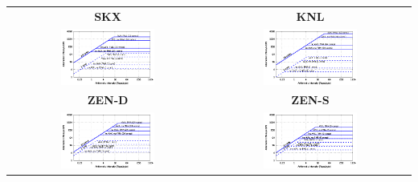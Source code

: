 \begin{tabular}{cc}
\multicolumn{1}{c}{\tiny \bfseries SKX} &
\multicolumn{1}{c}{\tiny \bfseries KNL} \\
  \includegraphics[width=0.49\textwidth,clip=true]{images/roofline/roofline_SKX.pdf}%
  & 
  \includegraphics[width=0.49\textwidth,clip=true]{images/roofline/roofline_KNL.pdf}%
  \\
  
\multicolumn{1}{c}{\tiny \bfseries
ZEN-D} & \multicolumn{1}{c}{\tiny \bfseries ZEN-S} \\
  \includegraphics[width=0.49\textwidth,clip=true]{images/roofline/roofline_ZEN-S.pdf}%
  & 
  \includegraphics[width=0.49\textwidth,clip=true]{images/roofline/roofline_ZEN-D.pdf}%
\\

\end{tabular}
%
